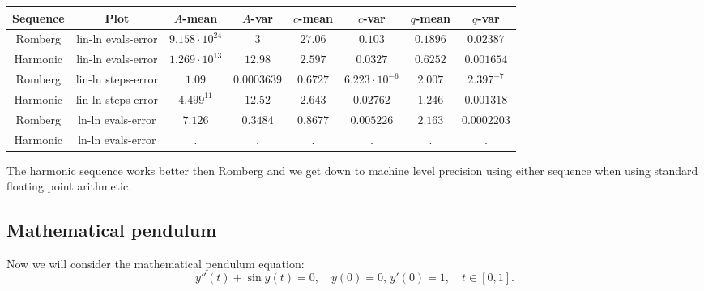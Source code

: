 \begin{table}[H]
    \centering
    \small
     \begin{tabular}{c|c||c|c|c|c|c|c}
Sequence & Plot & \(A\)-mean & \(A\)-var & \(c\)-mean & \(c\)-var & \(q\)-mean & \(q\)-var\\\hline
Romberg & lin-ln evals-error & \(9.158\cdot 10^{24}\) & \(3\) & \(27.06\) & \(0.103\) & \(0.1896\) & \(0.02387\) \\
Harmonic & lin-ln evals-error & \(1.269\cdot 10^{13}\) & \(12.98\) & \(2.597\) & \(0.0327\) & \(0.6252\) & \(0.001654\) \\
Romberg & lin-ln steps-error & \(1.09\) & \(0.0003639\) & \(0.6727\) & \(6.223\cdot 10^{-6}\) & \(2.007\) & \(2.397^{-7}\) \\
Harmonic & lin-ln steps-error & \(4.499^{11}\) & \(12.52\) & \(2.643\) & \(0.02762\) & \(1.246\) & \(0.001318\) \\
Romberg & ln-ln evals-error & \(7.126\) & \(0.3484\) & \(0.8677\) & \(0.005226\) & \(2.163\) & \(0.0002203\) \\
Harmonic & ln-ln evals-error & . & . & . & . & . & . \\
    \end{tabular}
    \label{tab:my_label}
\end{table}

The harmonic sequence works better then Romberg and we get down to machine level precision using either sequence when using standard floating point arithmetic.

\subsection{Mathematical pendulum}

Now we will consider the mathematical pendulum equation:
\begin{equation}
y''(t) + \sin y(t) = 0,\quad y(0) = 0,\, y'(0) = 1, \quad t\in [0,1].
\end{equation}

